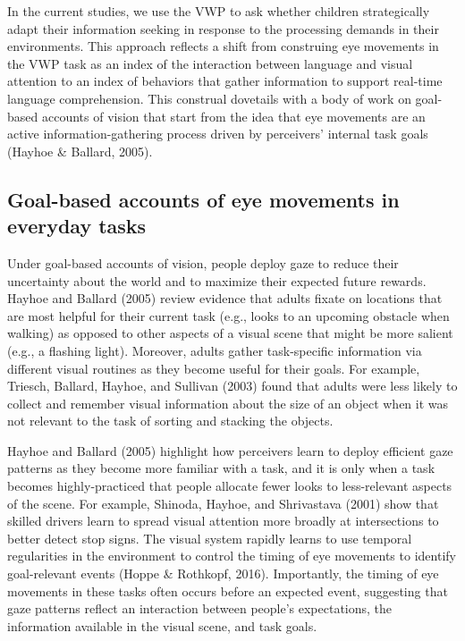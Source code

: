 \documentclass[,man,floatsintext]{apa6}
\begin{document}
In the current studies, we use the VWP to ask whether children
strategically adapt their information seeking in response to the
processing demands in their environments. This approach reflects a shift
from construing eye movements in the VWP task as an index of the
interaction between language and visual attention to an index of
behaviors that gather information to support real-time language
comprehension. This construal dovetails with a body of work on
goal-based accounts of vision that start from the idea that eye
movements are an active information-gathering process driven by
perceivers' internal task goals (Hayhoe \& Ballard, 2005).

\hypertarget{goal-based-accounts-of-eye-movements-in-everyday-tasks}{%
\subsection{Goal-based accounts of eye movements in everyday
tasks}\label{goal-based-accounts-of-eye-movements-in-everyday-tasks}}

Under goal-based accounts of vision, people deploy gaze to reduce their
uncertainty about the world and to maximize their expected future
rewards. Hayhoe and Ballard (2005) review evidence that adults fixate on
locations that are most helpful for their current task (e.g., looks to
an upcoming obstacle when walking) as opposed to other aspects of a
visual scene that might be more salient (e.g., a flashing light).
Moreover, adults gather task-specific information via different visual
routines as they become useful for their goals. For example, Triesch,
Ballard, Hayhoe, and Sullivan (2003) found that adults were less likely
to collect and remember visual information about the size of an object
when it was not relevant to the task of sorting and stacking the
objects.

Hayhoe and Ballard (2005) highlight how perceivers learn to deploy
efficient gaze patterns as they become more familiar with a task, and it
is only when a task becomes highly-practiced that people allocate fewer
looks to less-relevant aspects of the scene. For example, Shinoda,
Hayhoe, and Shrivastava (2001) show that skilled drivers learn to spread
visual attention more broadly at intersections to better detect stop
signs. The visual system rapidly learns to use temporal regularities in
the environment to control the timing of eye movements to identify
goal-relevant events (Hoppe \& Rothkopf, 2016). Importantly, the timing
of eye movements in these tasks often occurs before an expected event,
suggesting that gaze patterns reflect an interaction between people's
expectations, the information available in the visual scene, and task
goals.
\end{document}
